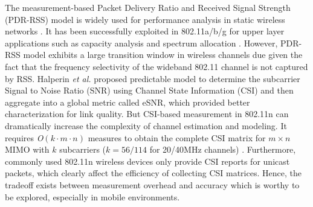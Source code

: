 \documentclass[draftclsnofoot,journal,onecolumn,11pt]{IEEEtran}
\begin{document}
The measurement-based Packet Delivery Ratio and Received Signal Strength (PDR-RSS) model is widely used for performance analysis in static wireless networks \cite{reis2006model}. It has been successfully exploited in 802.11a/b/g for upper layer applications such as capacity analysis \cite{kashyap2007capacity} and spectrum allocation \cite{k.rayanchu:fluid:}. However, PDR-RSS model exhibits a large transition window in wireless channels due given the fact that the frequency selectivity of the wideband 802.11 channel is not captured by RSS. Halperin \textit{et al.} \cite{Halperin2010predictable} proposed predictable model to determine the subcarrier Signal to Noise Ratio (SNR) using Channel State Information (CSI) and then aggregate into a global metric called eSNR, which provided better characterization for link quality. But CSI-based measurement in 802.11n can dramatically increase the complexity of channel estimation and modeling. It requires \textit{O}$(k\cdot m \cdot n)$ measures to obtain the complete CSI matrix for $m \times n$ MIMO with $k$ subcarriers ($k=56/114$ for 20/40MHz channels) \cite{CSI-SF}. Furthermore, commonly used 802.11n wireless devices only provide CSI reports for unicast packets, which clearly affect the efficiency of collecting CSI matrices. Hence, the tradeoff exists between measurement overhead and accuracy which is worthy to be explored, especially in mobile environments.
\end{document}
